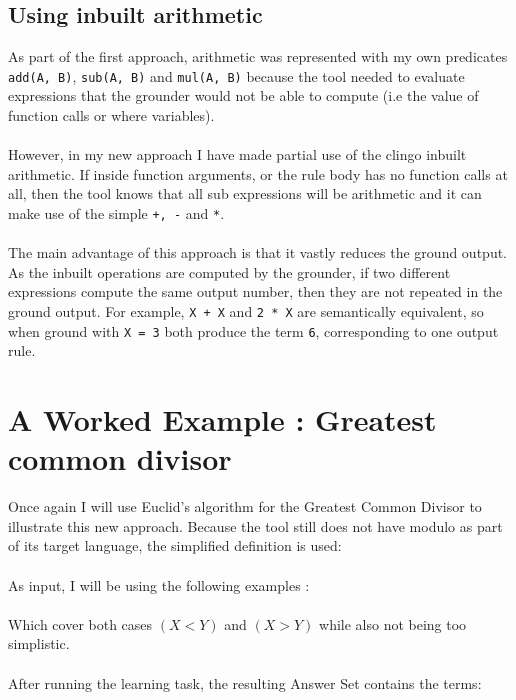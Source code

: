 \subsection{Using inbuilt arithmetic}
As part of the first approach, arithmetic was represented with my own predicates \lstinline{add(A, B)}, \lstinline{sub(A, B)} and \lstinline{mul(A, B)} because the tool needed to evaluate expressions that the grounder would not be able to compute (i.e the value of function calls or where variables). \\ \\ %
However, in my new approach I have made partial use of the clingo inbuilt arithmetic. If inside function arguments, or the rule body has no function calls at all, then the tool knows that all sub expressions will be arithmetic and it can make use of the simple \lstinline{+, -} and \lstinline{*}. \\ \\
The main advantage of this approach is that it vastly reduces the ground output. As the inbuilt operations are computed by the grounder, if two different expressions compute the same output number, then they are not repeated in the ground output. For example, \lstinline{X + X} and \lstinline{2 * X} are semantically equivalent, so when ground with \lstinline!X = 3! both produce the term \lstinline!6!, corresponding to one output rule.

\section{A Worked Example : Greatest common divisor}
Once again I will use Euclid's algorithm for the Greatest Common Divisor \cite{Euclid} to illustrate this new approach. Because the tool still does not have modulo as part of its target language, the simplified definition is used: \\

 
\mbox{} \\
As input, I will be using the following examples : \\

 
\mbox{} \\
Which cover both cases $(X < Y)$ and $(X > Y)$ while also not being too simplistic. \\ \\
After running the learning task, the resulting Answer Set contains the terms: \\

